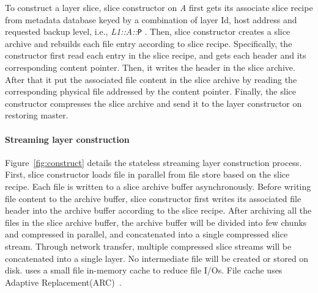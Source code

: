 To construct a layer slice,
slice constructor on \emph{A} first gets its associate slice recipe from metadata database 
keyed by a combination of  layer Id, host address and requested backup level, i.e., \emph{L1::A::}\texttt{P} .
Then, 
slice constructor creates a slice archive and 
rebuilds each file entry according to slice recipe.
Specifically,
the constructor first read each entry in the slice recipe,
and gets each header and its corresponding content pointer.
Then, it writes the header in the slice archive.
After that it put the associated file content in the slice archive
by reading the corresponding physical file addressed by the content pointer.
Finally, the slice constructor compresses the slice archive and send it to the layer constructor on restoring master.


\paragraph{Streaming layer construction}
Figure~\ref{fig:construct} details the stateless streaming layer construction process.
First, slice constructor loads file in parallel from file store based on the slice recipe.
Each file is written to a slice archive buffer asynchronously. %
Before writing file content to the archive buffer, slice constructor first writes its
associated 
file header into the archive buffer according to the slice recipe. 
After archiving all the files in the slice archive buffer,
the archive buffer will be divided into few chunks and compressed in parallel,
and concatenated into a single compressed slice stream.
Through network transfer, multiple compressed slice streams will be concatenated into a single layer.
No intermediate file will be created or stored on disk. %
\sysname uses a small file in-memory cache to reduce file I/Os. 
File cache uses Adaptive Replacement(ARC)~\cite{xxx}.

 
